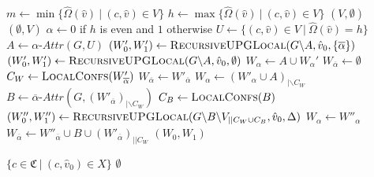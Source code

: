 \begin{algorithm}
	\caption{$\textsc{RecursiveUPGLocal}(\textit{PG } G = (\\
		V \subseteq \mathfrak{C} \times \hat{V},\\
		\hat{V}_0 \subseteq \hat{V},\\
		\hat{V}_1 \subseteq \hat{V},\\
		E \subseteq (\mathfrak{C} \times \hat{V}) \times (\mathfrak{C} \times \hat{V}),\\
		\hat{\Omega} : \hat{V} \rightarrow \mathbb{N}),\\
		\hat{v}_0 \in \hat{V},\\
		\Delta \subseteq \{ 0,1\})$}
	\label{alg_zlnk_collective_local}
	\begin{multicols}{2}
		\begin{algorithmic}[1]
			\State $m \gets \min\{ \hat{\Omega}(\hat{v})\ |\ (c,\hat{v}) \in V\}$
			\State $h \gets\max\{ \hat{\Omega}(\hat{v})\ |\ (c,\hat{v}) \in V\}$
			\State \Return $(V,\emptyset)$
			\Else
			\State \Return $(\emptyset, V)$
			\EndIf
			\EndIf
			\State $\alpha \gets 0$ if $h$ is even and $1$ otherwise
			\State $U \gets \{(c,\hat{v}) \in V\ |\ \hat{\Omega}(\hat{v}) = h\}$
			\State $A \gets \alpha\textit{-Attr}(G, U)$
			\If{$\overline{\alpha} \in \Delta$}
			\State $(W_0', W_1') \gets \textsc{RecursiveUPGLocal}(G \backslash A,\hat{v}_0,\{\overline{\alpha}\})$
			\Else
			\State $(W_0', W_1') \gets \textsc{RecursiveUPGLocal}(G \backslash A,\hat{v}_0,\emptyset)$
			\EndIf
			\State $W_\alpha \gets A \cup W_\alpha'$
			\State $W_{\overline{\alpha}} \gets \emptyset$
			\Else
				\State $C_W \gets \textsc{LocalConfs}(W'_{\overline{\alpha}})$
					\State $W_{\overline{\alpha}} \gets W'_{\overline{\alpha}}$
					\State $W_\alpha \gets (W'_\alpha \cup A)_{|\backslash C_W}$
				\Else
				\State $B \gets \overline{\alpha}\textit{-Attr}(G, (W'_{\overline{\alpha}})_{|\backslash C_W})$
				\State $C_B \gets \textsc{LocalConfs}(B)$
				\State $(W_0'', W_1'') \gets \textsc{RecursiveUPGLocal}(G \backslash B\backslash V_{|| C_W \cup C_B}, \hat{v}_0, \Delta)$
				\State $W_\alpha \gets W''_\alpha$
				\State $W_{\overline{\alpha}} \gets W''_{\overline{\alpha}} \cup B \cup (W'_{\overline{\alpha}})_{||C_W}$
				\EndIf
			\EndIf
			\State \Return $(W_0, W_1)$
		\end{algorithmic}\bigskip\bigskip\bigskip\bigskip\bigskip\bigskip\bigskip\bigskip\bigskip\bigskip\bigskip\bigskip\bigskip\bigskip\bigskip\bigskip\bigskip\bigskip\bigskip\bigskip\bigskip\bigskip\bigskip\bigskip\bigskip\bigskip
		\begin{algorithmic}[1]
			\If{$\overline{\alpha} \in \Delta$}
				\State \Return $\{ c \in \mathfrak{C}\ |\ (c, \hat{v}_0) \in X \}$
			\Else
				\State \Return $\emptyset$
			\EndIf
			\EndFunction
		\end{algorithmic}
	\end{multicols}
\end{algorithm}
